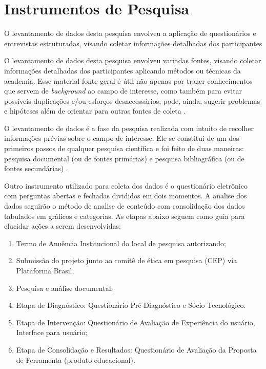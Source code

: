 \section{Instrumentos de Pesquisa}
\label{instrumentos}

O levantamento de dados desta pesquisa envolveu a aplicação de questionários e entrevistas estruturadas, visando coletar informações detalhadas dos participantes

O levantamento de dados desta pesquisa envolveu variadas fontes, visando coletar informações detalhadas dos participantes aplicando métodos ou técnicas da academia. Esse material-fonte geral é útil não apenas por trazer conhecimentos que servem de \textit{background} ao campo de interesse, como também para evitar possíveis duplicações e/ou esforços desnecessários; pode, ainda, sugerir problemas e hipóteses além de orientar para outras fontes de coleta \cite{marconi2017fundamentos}.

O levantamento de dados é a fase da pesquisa realizada com intuito de recolher informações prévias sobre o campo de interesse. Ele se constitui de um dos primeiros passos de qualquer pesquisa científica e foi feito de duas maneiras: pesquisa documental (ou de fontes primárias) e pesquisa bibliográfica (ou de fontes secundárias) \cite{marconi2017fundamentos}.

Outro instrumento utilizado para coleta dos dados é o questionário eletrônico com perguntas abertas e fechadas divididos em dois momentos. A analise dos dados seguirão o método de analise de conteúdo com consolidação dos dados tabulados em gráficos e categorias. As etapas abaixo seguem como guia para elucidar ações a serem desenvolvidas:

\begin{enumerate}
    \item Termo de Anuência Institucional do local de pesquisa autorizando;
    \item Submissão do projeto junto ao comitê de ética em pesquisa (CEP) via Plataforma Brasil;
    \item Pesquisa e análise documental;
    \item Etapa de Diagnóstico: Questionário Pré Diagnóstico e Sócio Tecnológico.
    \item Etapa de Intervenção: Questionário de Avaliação de Experiência do usuário, Interface para usuário;
    \item Etapa de Consolidação e Resultados: Questionário de Avaliação da Proposta de Ferramenta (produto educacional).
\end{enumerate}




